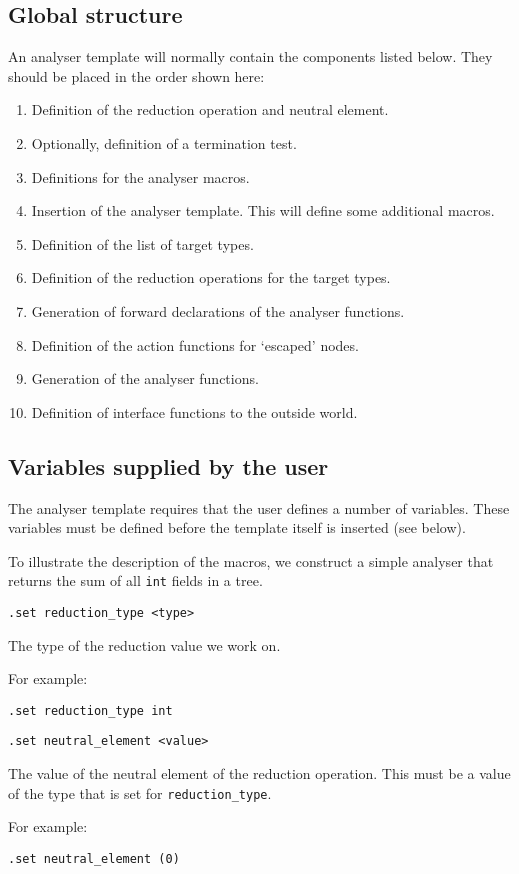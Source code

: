 \subsection{Global structure}
An analyser template will normally contain the components listed below.
They should be placed in the order shown here:
\begin{enumerate}
\item Definition of the reduction operation and neutral element.
\item Optionally, definition of a termination test.
\item Definitions for the analyser macros.
\item Insertion of the analyser template. This will define some
 additional macros.
\item Definition of the list of target types.
\item Definition of the reduction operations for the target types.
\item Generation of forward declarations of the analyser functions.
\item Definition of the action functions for `escaped' nodes.
\item Generation of the analyser functions.
\item Definition of interface functions to the outside world.
\end{enumerate}
\subsection{Variables supplied by the user}
The analyser template requires that the user defines a number of
variables.
These variables must be defined before the template itself is inserted
(see below).
\par
To illustrate the description of the macros, we construct a simple
analyser that returns the sum of all \texttt{int} fields in a tree.

\begin{verbatim}
.set reduction_type <type>
\end{verbatim}
\begin{desc}
The type of the reduction value we work on.
\par
For example:
\begin{verbatim}
.set reduction_type int
\end{verbatim}
\end{desc}

\begin{verbatim}
.set neutral_element <value>
\end{verbatim}
\begin{desc}
The value of the neutral element of the reduction operation.
This must be a value of the type that is set for \verb'reduction_type'.
\par
For example:
\begin{verbatim}
.set neutral_element (0)
\end{verbatim}
\end{desc}

